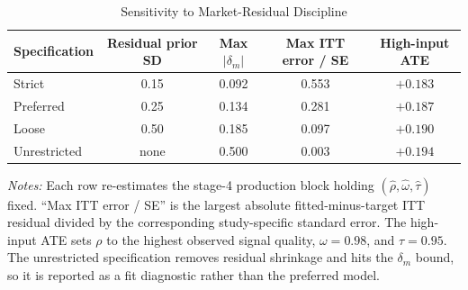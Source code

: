 \begin{table}[H]
\centering
\caption{Sensitivity to Market-Residual Discipline}
\label{tab:struct_resid_sensitivity}
\begin{threeparttable}
\begin{tabular}[t]{lcccc}
\toprule
Specification & Residual prior SD & Max $|\delta_m|$ & Max ITT error / SE & High-input ATE \\
\midrule
Strict & 0.15 & 0.092 & 0.553 & $+0.183$ \\
Preferred & 0.25 & 0.134 & 0.281 & $+0.187$ \\
Loose & 0.50 & 0.185 & 0.097 & $+0.190$ \\
Unrestricted & none & 0.500 & 0.003 & $+0.194$ \\
\bottomrule
\end{tabular}
\begin{tablenotes}
\footnotesize
\item \textit{Notes:} Each row re-estimates the stage-4 production block holding $(\hat{\rho},\hat{\omega},\hat{\tau})$ fixed. ``Max ITT error / SE'' is the largest absolute fitted-minus-target ITT residual divided by the corresponding study-specific standard error. The high-input ATE sets $\rho$ to the highest observed signal quality, $\omega=0.98$, and $\tau=0.95$. The unrestricted specification removes residual shrinkage and hits the $\delta_m$ bound, so it is reported as a fit diagnostic rather than the preferred model.
\end{tablenotes}
\end{threeparttable}
\end{table}
